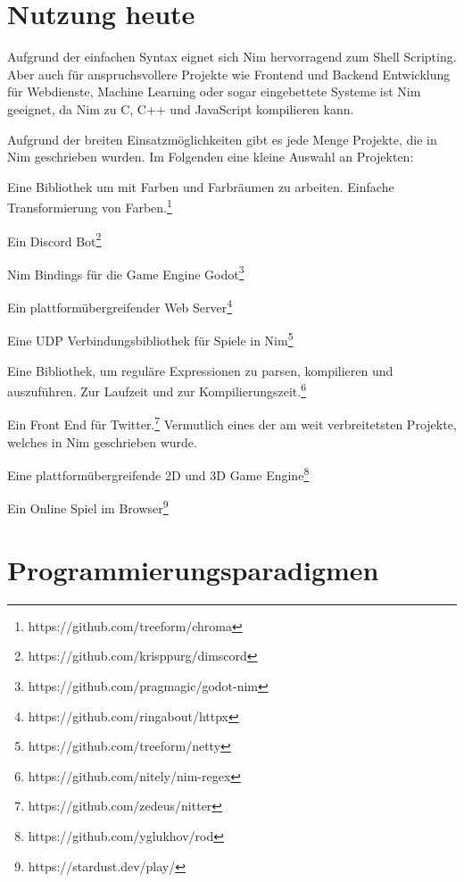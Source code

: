 \documentclass[11pt]{report}
\begin{document}
\section{Nutzung heute}
Aufgrund der einfachen Syntax eignet sich Nim hervorragend zum Shell Scripting.
Aber auch für anspruchsvollere Projekte wie Frontend und Backend Entwicklung für Webdienste, Machine Learning oder sogar eingebettete Systeme ist Nim geeignet, da Nim zu C, C++ und JavaScript kompilieren kann.

Aufgrund der breiten Einsatzmöglichkeiten gibt es jede Menge Projekte, die in Nim geschrieben wurden. Im Folgenden eine kleine Auswahl an Projekten:
\begin{description}
\addtolength{\itemindent}{0.60cm}
\item[Chroma] Eine Bibliothek um mit Farben und Farbräumen zu arbeiten. Einfache Transformierung von Farben.\footnote{https://github.com/treeform/chroma}
\item[dimscord] Ein Discord Bot\footnote{https://github.com/krisppurg/dimscord}
\item[godot-nim] Nim Bindings für die Game Engine Godot\footnote{https://github.com/pragmagic/godot-nim}
\item[httpx] Ein plattformübergreifender Web Server\footnote{https://github.com/ringabout/httpx}
\item[netty] Eine UDP Verbindungsbibliothek für Spiele in Nim\footnote{https://github.com/treeform/netty}
\item[nim-regex] Eine Bibliothek, um reguläre Expressionen zu parsen, kompilieren und auszuführen. Zur Laufzeit und zur Kompilierungszeit.\footnote{https://github.com/nitely/nim-regex}
\item[nitter] Ein Front End für Twitter.\footnote{https://github.com/zedeus/nitter} Vermutlich eines der am weit verbreitetsten Projekte, welches in Nim geschrieben wurde.
\item[rod] Eine plattformübergreifende 2D und 3D Game Engine\footnote{https://github.com/yglukhov/rod}
\item[Stardust] Ein Online Spiel im Browser\footnote{https://stardust.dev/play/}
\end{description}


\section{Programmierungsparadigmen}
\end{document}
